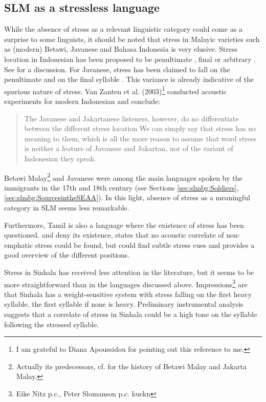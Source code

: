 \subsection{SLM as a stressless language}\label{sec:phon:SLMasastresslesslanguage}



While the absence of stress as a relevant linguistic category could come as a surprise to some linguists, it should be noted that stress in Malayic varieties such as (modern) Betawi, Javanese and Bahasa Indonesia is very elusive. Stress location in Indonesian has been proposed to be penultimate \citep{AlievaEtAl1991, Teeuw1984}, final \citep{Samsuri1971} or  arbitrary \citep{Halim1974, Zubkova1966}. See \citet{Ode1994} for a discussion. For Javanese, stress has been claimed to fall on the penultimate \citep{Ras1982} and on the final syllable \citep{Poedjoesoedarmo1982}. This variance is already indicative of the spurious nature of stress. Van Zanten et al. (2003)\nocite{vanZantenEtAl2003}\footnote{I am grateful to Diana Apoussidou for pointing out this reference to me.} conducted acoustic experiments for modern Indonesian and conclude:

\begin{quote}
	The Javanese and Jakartanese listeners, however, do no differentiate between the different stress location \el We can simply say that stress has no meaning to them, which is all the  more reason to assume that word stress is neither a feature of Javanese and Jakartan, nor of the variant of Indonesian they speak.
\end{quote}

Betawi Malay\footnote{Actually its predecessors, cf. \citet{Grijns1991} for the history of Betawi Malay and Jakarta Malay.} and Javanese were among the main languages spoken by the immigrants in the 17th and 18th century (see Sections \ref{sec:slmbg:Soldiers}, \ref{sec:slmbg:SourcesintheSEAA}). In this light, absence of stress as a meaningful category in SLM seems less remarkable.

Furthermore, Tamil is also a language where the existence of stress has been questioned. \citet{Pope1859, Arden1934} and \citet{Arokianathan1981} deny its existence, \citet{Balasubramanian1980} states that no acoustic correlate of non-emphatic stress could be found, but \citet{Keane2001} could find subtle stress cues and provides a good overview of the different positions.

Stress in Sinhala has received less attention in the literature, but it seems to be more straightforward than in the languages discussed above. Impressions\footnote{Eike Nitz p.c., Peter Slomanson p.c. kuckn} are that Sinhala has a weight-sensitive system with stress falling on the first heavy syllable, the first syllable if none is heavy. Preliminary instrumental analysis suggests that a correlate of stress in Sinhala could be a high tone on the syllable following the stressed syllable.

